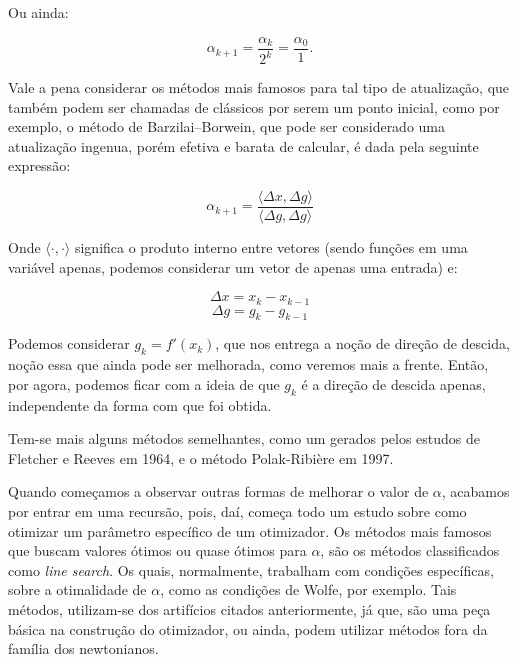 Ou ainda:

\begin{equation}
    \alpha_{k+1} = \frac{\alpha_{k}}{2^k} = \frac{\alpha_{0}}{1}.
\end{equation}

Vale a pena considerar os métodos mais famosos para tal tipo de atualização,
que também podem ser chamadas de clássicos por serem um ponto inicial, como por
exemplo, o método de Barzilai–Borwein, que pode ser considerado uma atualização
ingenua, porém efetiva e barata de calcular, é dada pela seguinte expressão:

\begin{equation}
    \alpha_{k+1} = \frac{\langle \Delta x, \Delta g \rangle}{\langle \Delta g, \Delta g \rangle}
\end{equation}

Onde \( \langle \cdot, \cdot \rangle \) significa o produto interno entre
vetores (sendo funções em uma variável apenas, podemos considerar um vetor de
apenas uma entrada) e:

\begin{equation}
    \Delta x = x_k - x_{k-1}
\end{equation}
\begin{equation}
    \Delta g = g_k - g_{k-1}
\end{equation}


Podemos considerar \(g_k = f'(x_k) \), que nos entrega a noção de direção de
descida, noção essa que ainda pode ser melhorada, como veremos mais a frente.
Então, por agora, podemos ficar com a ideia de que \(g_k\) é a direção de
descida apenas, independente da forma com que foi obtida.

Tem-se mais alguns métodos semelhantes, como um gerados pelos estudos de
Fletcher e Reeves em 1964, e o método Polak-Ribière em 1997.

Quando começamos a observar outras formas de melhorar o valor de \(\alpha\),
acabamos por entrar em uma recursão, pois, daí, começa todo um estudo sobre como
otimizar um parâmetro específico de um otimizador. Os métodos mais famosos que
buscam valores ótimos ou quase ótimos para \(\alpha\), são os métodos
classificados como \textit{line search}. Os quais, normalmente, trabalham
com condições específicas, sobre a otimalidade de \(\alpha\), como as condições
de Wolfe, por exemplo. Tais métodos, utilizam-se dos artifícios citados
anteriormente, já que, são uma peça básica na construção do otimizador,
ou ainda, podem utilizar métodos fora da família dos newtonianos.

